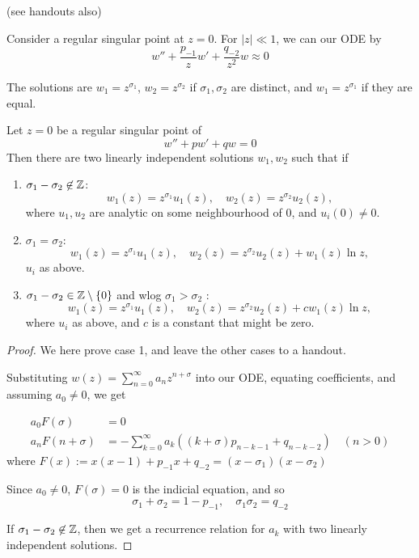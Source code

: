 \documentclass[a4paper]{article}
\begin{document}
(see handouts also)

Consider a regular singular point at $z=0$. For $|z|\ll 1$, we can our ODE by
\[
w'' + \frac{p_{-1}}{z}w' + \frac{q_{-2}}{z^2}w \approx 0
\] 

The solutions are $w_1 = z^{\sigma_1}$, $w_2 =z^{\sigma_2}$ if $\sigma_1, \sigma_2$ are distinct, and $w_1 = z^{\sigma_1}$ if they are equal.

\begin{thm}
	Let $z=0$ be a regular singular point of
	\[
	w'' + p w' + qw = 0 
	\] 
	Then there are two linearly independent solutions  $w_1, w_2$ such that if
	\begin{enumerate}
		\item $\sigma_1 - \sigma_2 \not\in \mathbb{Z}$: 
			\[
				w_1(z) = z^{\sigma_1} u_1(z), \quad w_2(z) = z^{\sigma_2}u_2(z)
			,\] where $u_1, u_2$ are analytic on some neighbourhood of 0, and $u_i(0) \neq 0$. \\
		\item $\sigma_1 = \sigma_2$:
			\[
				w_1(z) = z^{\sigma_1}u_1(z), \quad w_2(z) = z^{\sigma_2}u_2(z) + w_1(z) \ln z
			,\] $u_i$ as above. \\ 
		\item $\sigma_1 - \sigma_2 \in \mathbb{Z}\setminus \{0\} $ and wlog $\sigma_1 > \sigma_2$ :
			\[
				w_1(z) = z^{\sigma_1}u_1(z), \quad w_2(z) = z^{\sigma_2}u_2(z) + cw_1(z) \ln z
			,\] where $u_i$ as above, and $c$ is a constant that might be zero. 
			
	\end{enumerate}
\end{thm}

\begin{proof}
	We here prove case 1, and leave the other cases to a handout.

	Substituting $w(z) = \sum_{n=0}^{\infty} a_n z^{n+\sigma}$ into our ODE, equating coefficients, and assuming $a_0 \neq 0$, we get

	\begin{align*}
		a_0 F(\sigma) &= 0 \\
		a_n F(n+\sigma) &= - \sum_{k=0}^{\infty} a_k \left( (k+\sigma) p_{n-k-1} + q_{n-k-2} \right) \quad (n > 0) 
	\end{align*}
	where $F(x):= x(x-1) + p_{-1}x + q_{-2} = (x-\sigma_1)(x-\sigma_2)$

	Since $a_0 \neq 0$, $F(\sigma) = 0$ is the indicial equation, and so 
	\[
	\sigma_1 + \sigma_2 = 1 - p_{-1}, \quad \sigma_1\sigma_2 = q_{-2}
	\] 

	If $\sigma_1 - \sigma_2 \not\in \mathbb{Z}$, then we get a recurrence relation for $a_k$ with two linearly independent solutions.
\end{proof}
\end{document}
